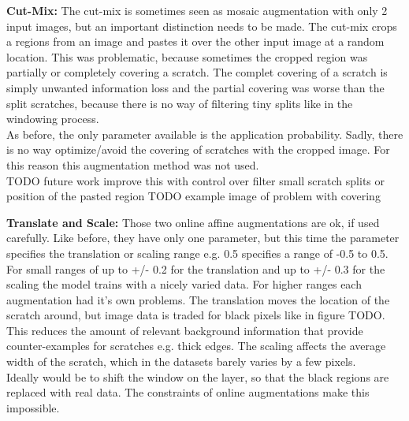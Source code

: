 \textbf{Cut-Mix:}
The cut-mix is sometimes seen as mosaic augmentation with only 2 input images, but an important distinction needs to be made. The cut-mix crops a regions from an image and pastes it over the other input image at a random location. This was problematic, because sometimes the cropped region was partially or completely covering a scratch. The complet covering of a scratch is simply unwanted information loss and the partial covering was worse than the split scratches, because there is no way of filtering tiny splits like in the windowing process. \\
As before, the only parameter available is the application probability. Sadly, there is no way optimize/avoid the covering of scratches with the cropped image. For this reason this augmentation method was not used. \\
TODO future work improve this with control over filter small scratch splits or position of the pasted region
TODO example image of problem with covering


\textbf{Translate and Scale: }
Those two online affine augmentations are ok, if used carefully. Like before, they have only one parameter, but this time the parameter specifies the translation or scaling range e.g. 0.5 specifies a range of -0.5 to 0.5. For small ranges of up to +/- 0.2 for the translation and up to +/- 0.3 for the scaling the model trains with a nicely varied data. For higher ranges each augmentation had it's own problems. The translation moves the location of the scratch around, but image data is traded for black pixels like in figure TODO. This reduces the amount of relevant background information that provide counter-examples for scratches e.g. thick edges. The scaling affects the average width of the scratch, which in the datasets barely varies by a few pixels. \\
Ideally would be to shift the window on the layer, so that the black regions are replaced with real data. The constraints of online augmentations make this impossible. \\

